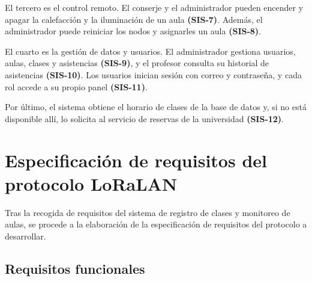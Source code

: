 El tercero es el control remoto. El conserje y el administrador pueden encender y apagar la calefacción y la iluminación de un aula \textbf{(SIS-7)}. Además, el administrador puede reiniciar los nodos y asignarles un aula \textbf{(SIS-8)}.

El cuarto es la gestión de datos y usuarios. El administrador gestiona usuarios, aulas, clases y asistencias \textbf{(SIS-9)}, y el profesor consulta su historial de asistencias \textbf{(SIS-10)}. Los usuarios inician sesión con correo y contraseña, y cada rol accede a su propio panel \textbf{(SIS-11)}.

Por último, el sistema obtiene el horario de clases de la base de datos y, si no está disponible allí, lo solicita al servicio de reservas de la universidad \textbf{(SIS-12)}.

\section{Especificación de requisitos del protocolo LoRaLAN}\label{sec:requisitos}

Tras la recogida de requisitos del sistema de registro de clases y monitoreo de aulas, se procede a la elaboración de la especificación de requisitos del protocolo a desarrollar. 

\subsection{Requisitos funcionales}

